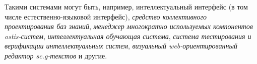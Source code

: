 Такими системами могут быть, например, интеллектуальный интерфейс (в том числе естественно-языковой интерфейс), \textit{средство коллективного проектирования баз знаний}, \textit{менеджер многократно используемых компонентов ostis-систем}, \textit{интеллектуальная обучающая система}, \textit{система тестирования и верификации интеллектуальных систем}, \textit{визуальный web-ориентированный редактор sc.g-текстов} и другие.

